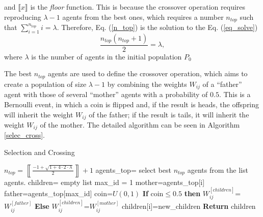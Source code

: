 \documentclass{iosart2c}
\begin{document}
and $\llbracket x\rrbracket$ is the \textit{floor} function. This is because the crossover operation requires reproducing $\lambda-1$ agents from the best ones, which requires a number $n_{top}$ such that $\sum_{i=1}^{n_{top}} i=\lambda$. Therefore, Eq. (\ref{n_top}) is the solution to the Eq. (\ref{eq_solve})
\begin{equation}\label{eq_solve}
	\frac{n_{top}(n_{top}+1)}{2}=\lambda,
\end{equation}
where $\lambda$ is the number of agents in the initial population $P_0$

The best $n_{top}$ agents are used to define the crossover operation, which aims to create a population of size $\lambda-1$ by combining the weights $W_{ij}$ of a ``father'' agent with those of several ``mother'' agents with a probability of $0.5$. This is a Bernoulli event, in which a coin is flipped and, if the result is heads, the offspring will inherit the weight $W_{ij}$ of the father; if the result is tails, it will inherit the weight $W_{ij}$ of the mother. The detailed algorithm can be seen in Algorithm \ref{selec_cross}.


\begin{algorithm}
\caption{Selection and Crossing}\label{selec_cross}
\begin{algorithmic}[1]
\State $n_{top}=\left\llbracket\frac{-1+\sqrt{1+4\cdot2\cdot\lambda}}{2}\right\rrbracket+1$
\State agents\_top= select best $n_{top}$ agents from the list agents.
\State children= empty list
\State max\_id = 1 
\State mother=agents\_top[i] 
\State father=agents\_top[max\_id] 
\State coin=$U(0,1)$ 
\State \textbf{If} coin$\leq0.5$ \textbf{then}
\State \hspace{0.5cm} $W_{ij}^{[children]}$=$W_{ij}^{[father]}$ 
\State \textbf{Else}
\State \hspace{0.5cm} $W_{ij}^{[children]}$=$W_{ij}^{[mother]}$ 
\EndFor
children[i]=new\_children
\EndFor
\EndWhile
\State \textbf{Return} children
\EndFunction
\end{algorithmic}
\end{algorithm}
\end{document}
